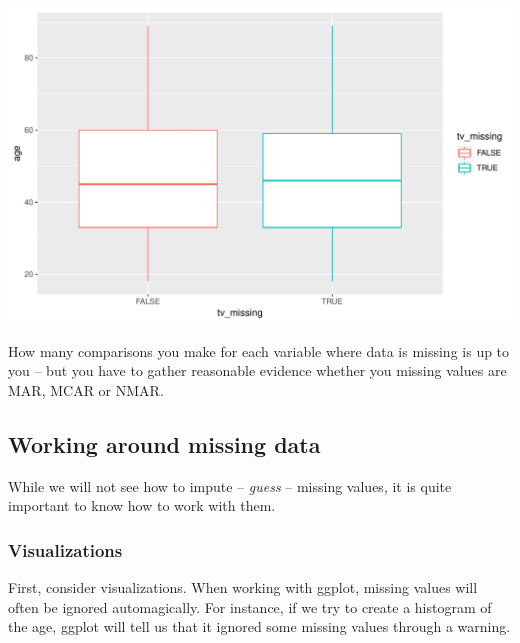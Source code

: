 \documentclass[]{tufte-book}
\newenvironment{Shaded}{}{}
\newcommand{\KeywordTok}[1]{\textcolor[rgb]{0.00,0.44,0.13}{\textbf{#1}}}
\newcommand{\DataTypeTok}[1]{\textcolor[rgb]{0.56,0.13,0.00}{#1}}
\newcommand{\DecValTok}[1]{\textcolor[rgb]{0.25,0.63,0.44}{#1}}
\newcommand{\StringTok}[1]{\textcolor[rgb]{0.25,0.44,0.63}{#1}}
\newcommand{\OperatorTok}[1]{\textcolor[rgb]{0.40,0.40,0.40}{#1}}
\newcommand{\NormalTok}[1]{#1}
\begin{document}
\includegraphics{cleaning_tutorial_files/figure-latex/unnamed-chunk-49-1}

How many comparisons you make for each variable where data is missing is
up to you -- but you have to gather reasonable evidence whether you
missing values are MAR, MCAR or NMAR.

\subsection{Working around missing
data}\label{working-around-missing-data}

While we will not see how to impute -- \emph{guess} -- missing values,
it is quite important to know how to work with them.

\subsubsection{Visualizations}\label{visualizations}

First, consider visualizations. When working with ggplot, missing values
will often be ignored automagically. For instance, if we try to create a
histogram of the age, ggplot will tell us that it ignored some missing
values through a warning.

\begin{Shaded}
\end{Shaded}
\end{document}
